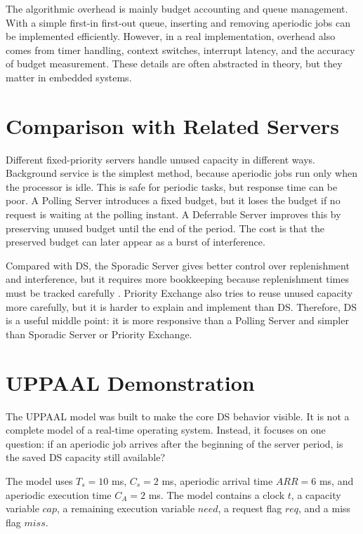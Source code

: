 \documentclass[conference]{IEEEtran}
\begin{document}
	The algorithmic overhead is mainly budget accounting and queue management. With a simple first-in first-out queue, inserting and removing aperiodic jobs can be implemented efficiently. However, in a real implementation, overhead also comes from timer handling, context switches, interrupt latency, and the accuracy of budget measurement. These details are often abstracted in theory, but they matter in embedded systems.
	
	\section{Comparison with Related Servers}
	
	Different fixed-priority servers handle unused capacity in different ways. Background service is the simplest method, because aperiodic jobs run only when the processor is idle. This is safe for periodic tasks, but response time can be poor. A Polling Server introduces a fixed budget, but it loses the budget if no request is waiting at the polling instant. A Deferrable Server improves this by preserving unused budget until the end of the period. The cost is that the preserved budget can later appear as a burst of interference.
	
	Compared with DS, the Sporadic Server gives better control over replenishment and interference, but it requires more bookkeeping because replenishment times must be tracked carefully \cite{sprunt1989}. Priority Exchange also tries to reuse unused capacity more carefully, but it is harder to explain and implement than DS. Therefore, DS is a useful middle point: it is more responsive than a Polling Server and simpler than Sporadic Server or Priority Exchange.
	
\section{UPPAAL Demonstration}

The UPPAAL model was built to make the core DS behavior visible. It is not a complete model of a real-time operating system. Instead, it focuses on one question: if an aperiodic job arrives after the beginning of the server period, is the saved DS capacity still available?

The model uses $T_s=10$ ms, $C_s=2$ ms, aperiodic arrival time $ARR=6$ ms, and aperiodic execution time $C_A=2$ ms. The model contains a clock $t$, a capacity variable $cap$, a remaining execution variable $need$, a request flag $req$, and a miss flag $miss$.
\end{document}
